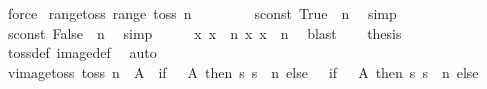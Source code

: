 \begin{isabellebody}
\ force%
\endisatagproof
{\isafoldproof}%
%
\isadelimproof
\isanewline
%
\endisadelimproof
\isanewline
{}\isamarkupfalse%
\ range{\isacharunderscore}{\kern0pt}toss{\isacharcolon}{\kern0pt}\ {\isachardoublequoteopen}range\ {\isacharparenleft}{\kern0pt}toss\ n{\isacharparenright}{\kern0pt}\ {\isacharequal}{\kern0pt}\ {\isacharbraceleft}{\kern0pt}{\isacharminus}{\kern0pt}{}{\isacharcomma}{\kern0pt}\ {}{\isacharbraceright}{\kern0pt}{\isachardoublequoteclose}\isanewline
%
\isadelimproof
%
\endisadelimproof
%
\isatagproof
{}\isamarkupfalse%
\ {\isacharminus}{\kern0pt}\isanewline
\ \ \isamarkupfalse%
\ {\isachardoublequoteopen}sconst\ True\ {\isacharbang}{\kern0pt}{\isacharbang}{\kern0pt}\ n{\isachardoublequoteclose}\ \isamarkupfalse%
\ simp\isanewline
\ \ \isamarkupfalse%
\ \isamarkupfalse%
\ {\isachardoublequoteopen}{\isasymnot}sconst\ False\ {\isacharbang}{\kern0pt}{\isacharbang}{\kern0pt}\ n{\isachardoublequoteclose}\ \isamarkupfalse%
\ simp\isanewline
\ \ \isamarkupfalse%
\ \isamarkupfalse%
\ {\isachardoublequoteopen}{\isasymexists}x{\isachardot}{\kern0pt}\ x\ {\isacharbang}{\kern0pt}{\isacharbang}{\kern0pt}\ n{\isachardoublequoteclose}\ {\isachardoublequoteopen}{\isasymexists}x{\isachardot}{\kern0pt}\ {\isasymnot}x\ {\isacharbang}{\kern0pt}{\isacharbang}{\kern0pt}\ n{\isachardoublequoteclose}\ \isamarkupfalse%
\ blast{\isacharplus}{\kern0pt}\isanewline
\ \ \isamarkupfalse%
\ {\isacharquery}{\kern0pt}thesis\ \isamarkupfalse%
\ toss{\isacharunderscore}{\kern0pt}def\ image{\isacharunderscore}{\kern0pt}def\ \isamarkupfalse%
\ auto\isanewline
{}\isamarkupfalse%
%
\endisatagproof
{\isafoldproof}%
%
\isadelimproof
\isanewline
%
\endisadelimproof
\isanewline
{}\isamarkupfalse%
\ vimage{\isacharunderscore}{\kern0pt}toss{\isacharcolon}{\kern0pt}\ {\isachardoublequoteopen}toss\ n\ {\isacharminus}{\kern0pt}{\isacharbackquote}{\kern0pt}\ A\ {\isacharequal}{\kern0pt}\ {\isacharparenleft}{\kern0pt}if\ {}\ {\isasymin}\ A\ then\ {\isacharbraceleft}{\kern0pt}s{\isachardot}{\kern0pt}\ s\ {\isacharbang}{\kern0pt}{\isacharbang}{\kern0pt}\ n{\isacharbraceright}{\kern0pt}\ else\ {\isacharbraceleft}{\kern0pt}{\isacharbraceright}{\kern0pt}{\isacharparenright}{\kern0pt}\ {\isasymunion}\ {\isacharparenleft}{\kern0pt}if\ {\isacharminus}{\kern0pt}{}\ {\isasymin}\ A\ then\ {\isacharbraceleft}{\kern0pt}s{\isachardot}{\kern0pt}\ {\isasymnot}s\ {\isacharbang}{\kern0pt}{\isacharbang}{\kern0pt}\ n{\isacharbraceright}{\kern0pt}\ else\ {\isacharbraceleft}{\kern0pt}{\isacharbraceright}{\kern0pt}{\isacharparenright}{\kern0pt}{\isachardoublequoteclose}\isanewline

\end{isabellebody}
